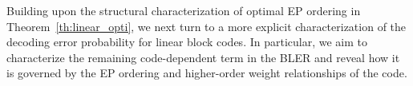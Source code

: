 \documentclass[letterpaper,draftclsnofoot,onecolumn]{IEEEtran}
\begin{document}
Building upon the structural characterization of optimal EP ordering in Theorem~\ref{th:linear_opti}, we next turn to a more explicit characterization of the decoding error probability for linear block codes. In particular, we aim to characterize the remaining code-dependent term in the BLER and reveal how it is governed by the EP ordering and higher-order weight relationships of the code.

\end{document}
